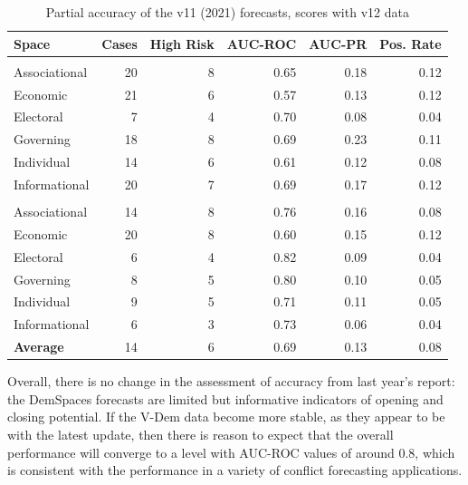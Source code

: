 \documentclass[
  11pt,
]{article}
\begin{document}
\begin{table}

\caption{\label{tab:v11-accuracy}Partial accuracy of the v11 (2021) forecasts, scores with v12 data}
\centering
\begin{tabular}[t]{lrrrrr}
\toprule
Space & Cases & High Risk & AUC-ROC & AUC-PR & Pos. Rate\\
\midrule
\addlinespace[0.3em]
\multicolumn{6}{l}{\textbf{Closing}}\\
\hspace{1em}Associational & 20 & 8 & 0.65 & 0.18 & 0.12\\
\hspace{1em}Economic & 21 & 6 & 0.57 & 0.13 & 0.12\\
\hspace{1em}Electoral & 7 & 4 & 0.70 & 0.08 & 0.04\\
\hspace{1em}Governing & 18 & 8 & 0.69 & 0.23 & 0.11\\
\hspace{1em}Individual & 14 & 6 & 0.61 & 0.12 & 0.08\\
\hspace{1em}Informational & 20 & 7 & 0.69 & 0.17 & 0.12\\
\addlinespace[0.3em]
\multicolumn{6}{l}{\textbf{Opening}}\\
\hspace{1em}Associational & 14 & 8 & 0.76 & 0.16 & 0.08\\
\hspace{1em}Economic & 20 & 8 & 0.60 & 0.15 & 0.12\\
\hspace{1em}Electoral & 6 & 4 & 0.82 & 0.09 & 0.04\\
\hspace{1em}Governing & 8 & 5 & 0.80 & 0.10 & 0.05\\
\hspace{1em}Individual & 9 & 5 & 0.71 & 0.11 & 0.05\\
\hspace{1em}Informational & 6 & 3 & 0.73 & 0.06 & 0.04\\
\addlinespace[0.3em]
\textbf{Average} & 14 & 6 & 0.69 & 0.13 & 0.08\\
\bottomrule
\end{tabular}
\end{table}

Overall, there is no change in the assessment of accuracy from last
year's report: the DemSpaces forecasts are limited but informative
indicators of opening and closing potential. If the V-Dem data become
more stable, as they appear to be with the latest update, then there is
reason to expect that the overall performance will converge to a level
with AUC-ROC values of around 0.8, which is consistent with the
performance in a variety of conflict forecasting applications.
\end{document}
